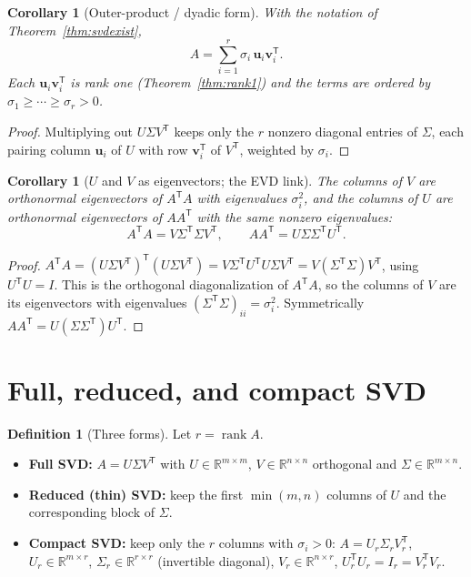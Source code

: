 \documentclass[11pt,oneside]{book}
\theoremstyle{plain}
\newtheorem{corollary}[theorem]{Corollary}
\theoremstyle{definition}
\newtheorem{definition}[theorem]{Definition}
\theoremstyle{remark}
\newcommand{\R}{\mathbb{R}}
\newcommand{\rank}{\operatorname{rank}}
\newcommand{\T}{^{\mathsf T}}
\newcommand{\bu}{\mathbf{u}}
\newcommand{\bv}{\mathbf{v}}
\begin{document}
\begin{corollary}[Outer-product / dyadic form]\label{cor:dyadic}
With the notation of Theorem~\ref{thm:svdexist},
\[
A=\sum_{i=1}^{r}\sigma_i\,\bu_i\bv_i\T .
\]
Each $\bu_i\bv_i\T$ is rank one (Theorem~\ref{thm:rank1}) and the terms are ordered by
$\sigma_1\ge\cdots\ge\sigma_r>0$.
\end{corollary}
\begin{proof}
Multiplying out $U\Sigma V\T$ keeps only the $r$ nonzero diagonal entries of $\Sigma$,
each pairing column $\bu_i$ of $U$ with row $\bv_i\T$ of $V\T$, weighted by $\sigma_i$.
\end{proof}

\begin{corollary}[$U$ and $V$ as eigenvectors; the EVD link]\label{cor:evdlink}
The columns of $V$ are orthonormal eigenvectors of $A\T A$ with eigenvalues $\sigma_i^2$,
and the columns of $U$ are orthonormal eigenvectors of $AA\T$ with the same nonzero
eigenvalues:
\[
A\T A=V\Sigma\T\Sigma V\T,\qquad AA\T=U\Sigma\Sigma\T U\T .
\]
\end{corollary}
\begin{proof}
$A\T A=(U\Sigma V\T)\T(U\Sigma V\T)=V\Sigma\T U\T U\Sigma V\T=V(\Sigma\T\Sigma)V\T$,
using $U\T U=I$. This is the orthogonal diagonalization of $A\T A$, so the columns of $V$
are its eigenvectors with eigenvalues $(\Sigma\T\Sigma)_{ii}=\sigma_i^2$. Symmetrically
$AA\T=U(\Sigma\Sigma\T)U\T$.
\end{proof}

\section{Full, reduced, and compact SVD}

\begin{definition}[Three forms]\label{def:svdforms}
Let $r=\rank A$.
\begin{itemize}[leftmargin=1.6em]
\item \textbf{Full SVD:} $A=U\Sigma V\T$ with $U\in\R^{m\times m}$,
$V\in\R^{n\times n}$ orthogonal and $\Sigma\in\R^{m\times n}$.
\item \textbf{Reduced (thin) SVD:} keep the first $\min(m,n)$ columns of $U$ and the
corresponding block of $\Sigma$.
\item \textbf{Compact SVD:} keep only the $r$ columns with $\sigma_i>0$:
$A=U_r\Sigma_r V_r\T$, $U_r\in\R^{m\times r}$, $\Sigma_r\in\R^{r\times r}$
(invertible diagonal), $V_r\in\R^{n\times r}$, $U_r\T U_r=I_r=V_r\T V_r$.
\end{itemize}
\end{definition}
\end{document}
